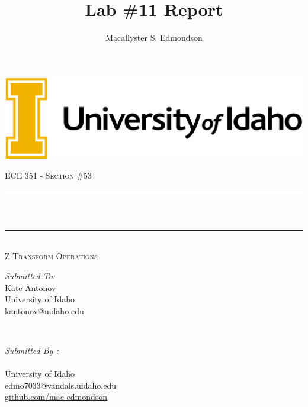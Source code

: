 \documentclass[12pt]{report}
\title{Lab \#11 Report}
\author{Macallyster S. Edmondson}
\date{\longdate\displaydate{date}}
\makeatletter
\let\thetitle\@title
\let\theauthor\@author
\makeatother
\begin{document}
\begin{titlepage}\thispagestyle{titlepage}
\centering
\includegraphics[scale = 0.12]{univ-logo.png}\\[1.0 cm]
\begin{center}    \textsc{\Large   ECE 351 - Section \#53 }\\[2.0 cm]
\end{center}%

\rule{\linewidth}{0.2 mm} \\[0.4 cm]
{ \huge \bfseries \thetitle}\\
\rule{\linewidth}{0.2 mm} \\[0.5 cm]
\textsc{\Large Z-Transform Operations }\\[1.5 cm] %
\begin{minipage}{0.4\textwidth}
\begin{flushleft} \large
\emph{Submitted To:}\\
Kate Antonov\\ \small
University of Idaho\\
kantonov@uidaho.edu\\
\hfill
\end{flushleft}
\end{minipage}~
\begin{minipage}{0.4\textwidth}
\begin{flushright} \large
\emph{Submitted By :} \\
\theauthor \\ \small
University of Idaho\\
edmo7033@vandals.uidaho.edu\\
\href{http://github.com/mac-edmondson}{github.com/mac-edmondson}\\
\end{flushright}
\end{minipage}\\[2 cm]
\vfill
\end{titlepage}
\tableofcontents\thispagestyle{customplain}
\pagebreak
\renewcommand{\thesection}{\arabic{section}}
\end{document}
